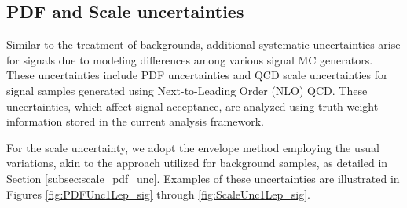 \label{subsec:sig_uncer}


\subsection{PDF and Scale uncertainties}
\label{subsec:sig_uncer_scales_PDF}

Similar to the treatment of backgrounds, additional systematic uncertainties arise for signals due to modeling differences among various signal MC generators. 
These uncertainties include PDF uncertainties and QCD scale uncertainties for signal samples generated using Next-to-Leading Order (NLO) QCD. 
These uncertainties, which affect signal acceptance, are analyzed using truth weight information stored in the current analysis framework.

For the scale uncertainty, we adopt the envelope method employing the usual variations, akin to the approach utilized for background samples, as detailed in Section \ref{subsec:scale_pdf_unc}. Examples of these uncertainties are illustrated in Figures \ref{fig:PDFUnc1Lep_sig} through \ref{fig:ScaleUnc1Lep_sig}.

